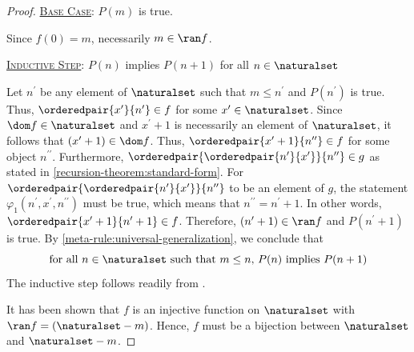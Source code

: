 \begin{proof}
    \vspace{0.3cm}
    \noindent
    \underline{\scshape Base Case}: \( P(m) \) is true.

    \vspace{0.3cm}
    \noindent
    Since \( f(0) = m \), necessarily \( m \in \ran f \).

    \vspace{0.3cm}
    \noindent
    \underline{\scshape Inductive Step}: \( P(n) \) implies \( P(n + 1) \) for all \( n \in \naturalset \)

    \vspace{0.3cm}
    \noindent
    Let \( n^{\prime} \) be any element of \( \naturalset \) such that \(  m \leq n^{\prime} \) and \( P(n^{\prime}) \) is true.
    Thus, \( \orderedpair{x^{\prime}}{n^{\prime}} \in f \) for some \( x^{\prime} \in \naturalset \).
    Since \( \dom f \in \naturalset \) and \( x^{\prime} + 1 \) is necessarily an element of \( \naturalset \), it follows
    that \( \mleft( x^{\prime} + 1 \mright) \in \dom f \).
    Thus, \( \orderedpair{x^{\prime} + 1}{n^{\prime\prime}} \in f \) for some object \( n^{\prime\prime} \).
    Furthermore, \( \orderedpair{\orderedpair{n^{\prime}}{x^{\prime}}}{n^{\prime\prime}} \in g \) as stated
    in \cref{recursion-theorem:standard-form}.
    For \(  \orderedpair{\orderedpair{n^{\prime}}{x^{\prime}}}{n^{\prime\prime}}  \) to be an element of \( g \),
    the statement \( \varphi_{1}(n^{\prime}, x^{\prime}, n^{\prime\prime}) \) must be true, which means that
    \( n^{\prime\prime} = n^{\prime} + 1 \).
    In other words, \( \orderedpair{x^{\prime} + 1}{n^{\prime} + 1} \in f \).
    Therefore, \( \mleft( n^{\prime} + 1 \mright) \in \ran f \) and \( P(n^{\prime} + 1) \) is true.
    By \cref{meta-rule:universal-generalization}, we conclude that
    \begin{equation*}
        \text{for all \( n \in \naturalset \) such that \( m \leq n \), \( P(n) \) implies \( P(n + 1) \)}
    \end{equation*}
    The inductive step follows readily from .

    \vspace{0.3cm}
    \noindent
    It has been shown that \( f \) is an injective function on \( \naturalset \) with \( \ran f = \mleft( \naturalset - m \mright) \).
    Hence, \( f \) must be a bijection between \( \naturalset \) and \( \naturalset - m \).
\end{proof}

